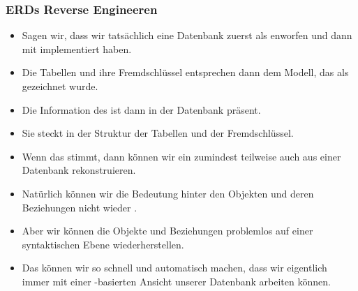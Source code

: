 \documentclass[aspectratio=169,mathserif,notheorems]{beamer}%
\begin{document}
%
\begin{frame}%
\frametitle{ERDs Reverse Engineeren}%
\begin{itemize}%
\item Sagen wir, dass wir tatsächlich eine Datenbank zuerst als  enworfen und dann mit  implementiert haben.%
%
\item<2-> Die Tabellen und ihre Fremdschlüssel entsprechen dann dem Modell, das als  gezeichnet wurde.%
%
\item<3-> Die Information des  ist dann in der Datenbank präsent.%
%
\item<4-> Sie steckt in der Struktur der Tabellen und der Fremdschlüssel.%
%
\item<5-> Wenn das stimmt, dann können wir ein  zumindest teilweise auch aus einer Datenbank rekonstruieren.%
%
\item<6-> Natürlich können wir die Bedeutung hinter den Objekten und deren Beziehungen nicht wieder .%
%
\item<7-> Aber wir können die Objekte und Beziehungen problemlos auf einer syntaktischen Ebene wiederherstellen.%
%
\item<8-> Das können wir so schnell und automatisch machen, dass wir eigentlich immer mit einer -basierten Ansicht unserer Datenbank arbeiten können.%
%
\end{itemize}%
\end{frame}%
%
\end{document}
